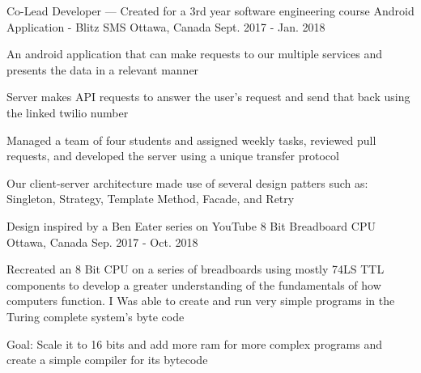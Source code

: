 
\begin{cventries}

  \cventry
    {Co-Lead Developer --- Created for a 3rd year software engineering course} %
    {Android Application - Blitz SMS} %
    {Ottawa, Canada} %
    {Sept. 2017 - Jan. 2018} %
    {
      \begin{cvitems} %
        \item An android application that can make requests to our multiple services and presents the data in a relevant manner
        \item Server makes API requests to answer the user's request and send that back using the linked twilio number
        \item Managed a team of four students and assigned weekly tasks, reviewed pull requests, and developed the server using a unique transfer protocol
        \item Our client-server architecture made use of several design patters such as: Singleton, Strategy, Template Method, Facade, and Retry
      \end{cvitems}
    }

  \cventry
    {Design inspired by a Ben Eater series on YouTube} %
    {8 Bit Breadboard CPU} %
    {Ottawa, Canada} %
    {Sep. 2017 - Oct. 2018} %
    {
      \begin{cvitems} %
        \item Recreated an 8 Bit CPU on a series of breadboards using mostly 74LS TTL components to develop a greater understanding of the fundamentals of how computers function. I Was able to create and run very simple programs in the Turing complete system's byte code
        \item Goal: Scale it to 16 bits and add more ram for more complex programs and create a simple compiler for its bytecode
      \end{cvitems}
    }

\end{cventries}